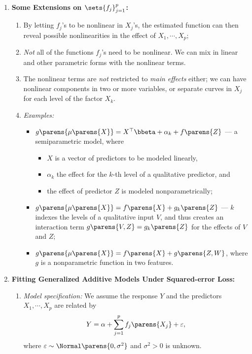 \documentclass[12pt]{article}
\begin{document}
\begin{enumerate}[label=\textbf{\arabic*.}]
	\item \textbf{Some Extensions on $\sets{f_j}_{j=1}^p$:} 
	\begin{enumerate}
		\item By letting $f_j$'s to be nonlinear in $X_j$'s, the estimated function can then reveal possible nonlinearities in the effect of $X_1, \cdots, X_p$; 
		\item \emph{Not} all of the functions $f_j$'s need to be nonlinear. We can mix in linear and other parametric forms with the nonlinear terms. 
		\item The nonlinear terms are \emph{not} restricted to \emph{main effects} either; we can have nonlinear components in two or more variables, or separate curves in $X_j$ for each level of the factor $X_k$. 
		\item \textit{Examples:} 
		\begin{itemize}
			\item $g \parens{\mu \parens{X}} = X^\top \bbeta + \alpha_k + f \parens{Z}$ --- a semiparametric model, where 
			\begin{itemize}
				\item $X$ is a vector of predictors to be modeled linearly, 
				\item $\alpha_k$ the effect for the $k$-th level of a qualitative predictor, and 
				\item the effect of predictor $Z$ is modeled nonparametrically; 
			\end{itemize}
			\item $g \parens{\mu \parens{X}} = f \parens{X} + g_k \parens{Z}$ --- $k$ indexes the levels of a qualitative input $V$, and thus creates an interaction term $g \parens{V, Z} = g_k \parens{Z}$ for the effects of $V$ and $Z$; 
			\item $g \parens{\mu \parens{X}} = f \parens{X} + g \parens{Z, W}$, where $g$ is a nonparametric function in two features. 
		\end{itemize}
	\end{enumerate}
	
	\item \textbf{Fitting Generalized Additive Models Under Squared-error Loss:} 
	\begin{enumerate}
		\item \textit{Model specification:} We assume the response $Y$ and the predictors $X_1, \cdots, X_p$ are related by 
		\begin{align*}
			Y = \alpha + \sum_{j=1}^p f_j \parens{X_j} + \varepsilon, 
		\end{align*}
		where $\varepsilon \sim \Normal \parens{0, \sigma^2}$ and $\sigma^2 > 0$ is unknown. 
		

\end{enumerate}
\end{enumerate}
\end{document}
